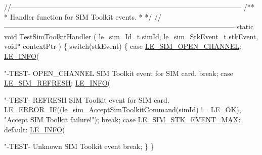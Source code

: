 \begin{DoxyCodeInclude}
\textcolor{comment}{//--------------------------------------------------------------------------------------------------}\textcolor{comment}{}
\textcolor{comment}{/**}
\textcolor{comment}{ * Handler function for SIM Toolkit events.}
\textcolor{comment}{ *}
\textcolor{comment}{ */}
\textcolor{comment}{//--------------------------------------------------------------------------------------------------}
\textcolor{keyword}{static} \textcolor{keywordtype}{void} TestSimToolkitHandler
(
    \hyperlink{le__sim__interface_8h_aace49df88426119626fb1ef4e544ccdd}{le\_sim\_Id\_t}       simId,
    \hyperlink{le__sim__interface_8h_a7c53ab7f9f004387ef41e80df1121da2}{le\_sim\_StkEvent\_t} stkEvent,
    \textcolor{keywordtype}{void}*             contextPtr
)
\{
    \textcolor{keywordflow}{switch}(stkEvent)
    \{
        \textcolor{keywordflow}{case} \hyperlink{le__sim__interface_8h_a7c53ab7f9f004387ef41e80df1121da2a7207480abc036ae29469da1801033b2d}{LE\_SIM\_OPEN\_CHANNEL}:
            \hyperlink{le__log_8h_a23e6d206faa64f612045d688cdde5808}{LE\_INFO}(\textcolor{stringliteral}{"-TEST- OPEN\_CHANNEL SIM Toolkit event for SIM card.%
            \textcolor{keywordflow}{break};
        \textcolor{keywordflow}{case} \hyperlink{le__sim__interface_8h_a7c53ab7f9f004387ef41e80df1121da2a4e4be9cfce6ef2e0832d707820cd106d}{LE\_SIM\_REFRESH}:
            \hyperlink{le__log_8h_a23e6d206faa64f612045d688cdde5808}{LE\_INFO}(\textcolor{stringliteral}{"-TEST- REFRESH SIM Toolkit event for SIM card.%
            \hyperlink{le__log_8h_aceaf11a11691d6c676e36dd317b38dbd}{LE\_ERROR\_IF}((\hyperlink{le__sim__interface_8h_a8cc75a17466446c19c5bd941b1360e0e}{le\_sim\_AcceptSimToolkitCommand}(simId) != 
      LE\_OK),
                        \textcolor{stringliteral}{"Accept SIM Toolkit failure!"});
            \textcolor{keywordflow}{break};
        \textcolor{keywordflow}{case} \hyperlink{le__sim__interface_8h_a7c53ab7f9f004387ef41e80df1121da2aa086ea0a94ca7065b6baf974e11ed707}{LE\_SIM\_STK\_EVENT\_MAX}:
        \textcolor{keywordflow}{default}:
            \hyperlink{le__log_8h_a23e6d206faa64f612045d688cdde5808}{LE\_INFO}(\textcolor{stringliteral}{"-TEST- Unknown SIM Toolkit event %
            \textcolor{keywordflow}{break};
    \}
\}

}}}
\end{DoxyCodeInclude}
